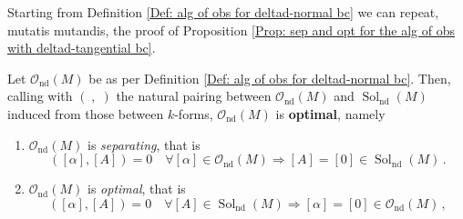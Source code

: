 \noindent Starting from Definition \ref{Def: alg of obs for deltad-normal bc} we can repeat, mutatis mutandis, the proof of Proposition \ref{Prop: sep and opt for the alg of obs with deltad-tangential bc}.

\begin{proposition}\label{Prop: sep and opt for alg of obs of the deltad-normal bc}
	Let $\mathcal{O}_{\mathrm{nd}}(M)$ be as per Definition \ref{Def: alg of obs for deltad-normal bc}.
	Then, calling with $(\;,\;)$ the natural pairing between $\mathcal{O}_{\mathrm{nd}}(M)$ and $\operatorname{Sol}_{\mathrm{nd}}(M)$ induced from those between $k$-forms, $\mathcal{O}_{\mathrm{nd}}(M)$ is {\bf optimal}, namely
	\begin{enumerate}
		\item
		$\mathcal{O}_{\mathrm{nd}}(M)$ is {\em separating}, that is
		\begin{equation} \label{Eqn: optimality for alg with deltad-normal bc}
		([\alpha],[A])=0\quad\forall
		[\alpha]\in\mathcal{O}_{\mathrm{nd}}(M)\Longrightarrow [A]=[0]\in\operatorname{Sol}_{\mathrm{nd}}(M)\,.
		\end{equation}
		\item 
		$\mathcal{O}_{\mathrm{nd}}(M)$ is {\em optimal}, that is
		\begin{equation}\label{Eqn: separability for alg with deltad-normal bc}
		([\alpha],[A])=0\quad\forall
		[A]\in\operatorname{Sol}_{\mathrm{nd}}(M)\Longrightarrow[\alpha]=[0]\in\mathcal{O}_{\mathrm{nd}}(M)\,,
		\end{equation}
	\end{enumerate}
\end{proposition}
